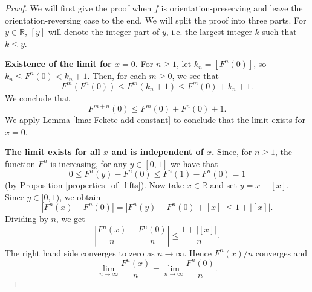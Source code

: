 \documentclass[12pt]{article}
\theoremstyle{definition}
\theoremstyle{remark}
\begin{document}
\begin{proof}
We will first give the proof when $f$ is orientation-preserving
and leave the orientation-reversing case to the end.
We will split the proof into three parts. For $y \in \mathbb R$, $[y]$ will denote the integer part of $y$, i.e. the largest integer $k$ such that $k \le y$.

\medskip
\noindent
{\bf Existence of the limit for $x=0$.}
For $n \ge 1$, let $k_n = [F^n(0)]$, so
$k_n \le F^n(0) <  k_n +1$. Then, for each $m\geq 0$, we see that 
\[
F^{m}(F^{n}(0))\leq F^m(k_n+1)\leq F^{m}(0)+k_n+1.
\]
We conclude that
\[
F^{m+n}(0)\leq F^{m}(0)+F^{n}(0)+1.
\]
We apply Lemma \ref{lma: Fekete add constant} to conclude that the limit exists for $x=0$.

\medskip
\noindent
{\bf The limit exists for all $x$ and is independent of $x$.}
Since, for $n \ge 1$, the function $F^n$ is increasing, for any $y \in [0,1]$ we have that
\[
0 \le F^n(y)-F^n(0) \le F^n(1)-F^n(0) =1
\]
(by Proposition \ref{properties_of_lifts}). 
Now take $x \in \mathbb R$ and set $y = x-[x]$. Since $y \in [0,1)$, we obtain
\[
|F^n(x)-F^n(0)| = |F^n(y) -F^n(0) +[x]| \le 1 + |[x]|.
\]
Dividing by $n$, we get
\[
\left|\frac{F^n(x)}{n} -\frac{F^n(0)}{n}\right| \le \frac{1+|[x]|}{n}.
\]
The right hand side converges to zero as $n \to \infty$. Hence $F^n(x)/n$ converges and
\[
\lim_{n \to \infty} \frac{F^n(x)}{n} =\lim_{n \to \infty} \frac{F^n(0)}{n}.
\]


\end{proof}
\end{document}
